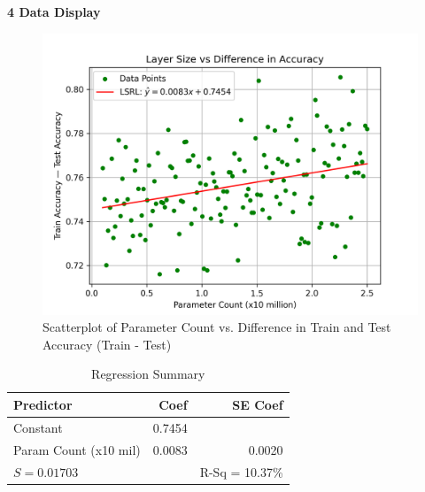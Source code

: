 \documentclass[12pt]{article}
\begin{document}
    \noindent\textbf{4 Data Display}
    \begin{figure}[H]
        \centering
        \includegraphics[width=1\textwidth]{Images/Scatter}
        \caption{Scatterplot of Parameter Count vs. Difference in Train and Test Accuracy (Train - Test)}
        \label{fig:scatterplot}
    \end{figure}

    \begin{table}[ht]
        \centering
        \begin{tabular}{|l|r|r|}
            \hline
            Predictor & Coef & SE Coef \\
            \hline
            Constant & 0.7454 &  \\
            Param Count (x10 mil)   & 0.0083 & 0.0020 \\
            \hline
            \multicolumn{2}{|l|}{$S = 0.01703$} & R-Sq = 10.37\% \\
            \hline
        \end{tabular}
        \caption{Regression Summary}
        \label{tab:minitab}
    \end{table}
\end{document}
